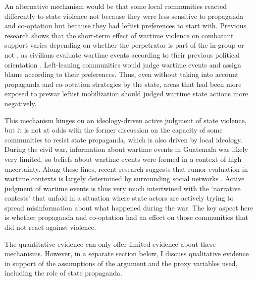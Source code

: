 \documentclass[12pt, notitlepage]{article}
\begin{document}
An alternative mechanism would be that some local communities reacted differently to state violence not because they were less sensitive to propaganda and co-optation but because they had leftist preferences to start with.
Previous research shows that the short-term effect of wartime violence on combatant support varies depending on whether the perpetrator is part of the in-group or not \citep{Lyall:2013aa}, as civilians evaluate wartime events according to their previous political orientation \citep{Silverman:2019aa, Pechenkina:2020ul}.
Left-leaning communities would judge wartime events and assign blame according to their preferences.
Thus, even without taking into account propaganda and co-optation strategies by the state, areas that had been more exposed to prewar leftist mobilization should judged wartime state actions more negatively.

This mechanism hinges on an ideology-driven active judgment of state violence, but it is not at odds with the former discussion on the capacity of some communities to resist state propaganda, which is also driven by local ideology.
During the civil war, information about wartime events in Guatemala was likely very limited, so beliefs about wartime events were formed in a context of high uncertainty.
Along these lines, recent research suggests that rumor evaluation in wartime contexts is largely determined by surrounding social networks \citep{Schon:2021wf}.
Active judgment of wartime events is thus very much intertwined with the `narrative contests' that unfold in a situation where state actors are actively trying to spread misinformation about what happened during the war.
The key aspect here is whether propaganda and co-optation had an effect on those communities that did not react against violence.

The quantitative evidence can only offer limited evidence about these mechanisms.
However, in a separate section below, I discuss qualitative evidence in support of the assumptions of the argument and the proxy variables used, including the role of state propaganda.

\end{document}
